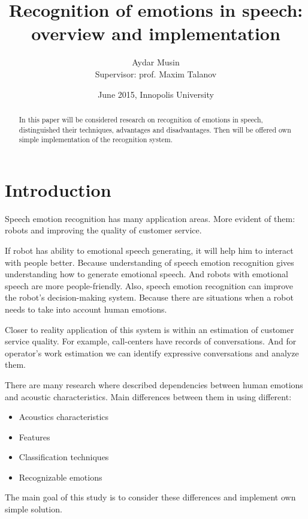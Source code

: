 \documentclass[12pt, letterpaper]{article}
\title{Recognition of emotions in speech:\\overview and implementation}
\author{Aydar Musin\\Supervisor: prof. Maxim Talanov}
\date{June 2015, Innopolis University}
\begin{document}
\begin{titlepage}
\maketitle
\end{titlepage}

\begin{abstract}
In this paper will be considered research on recognition of emotions in speech, distinguished their techniques, advantages and disadvantages. Then will be offered own simple implementation of the recognition system.
\end{abstract}

\section{Introduction}

Speech emotion recognition has many application areas. More evident of them: robots and improving the quality of customer service.

If robot has ability to emotional speech generating, it will help him to interact with people better. Because understanding of speech emotion recognition gives understanding how to generate emotional speech. And robots with emotional speech are more people-friendly. Also, speech emotion recognition can improve the robot's decision-making system. Because there are situations when a robot needs to take into account human emotions. %

Closer to reality application of this system is within an estimation of customer service quality. For example, call-centers have records of conversations. And for operator's work estimation we can identify expressive conversations and analyze them.

There are many research where described dependencies between human emotions and acoustic characteristics. Main differences between them in using different:
\begin{itemize}
	\item Acoustics characteristics
	\item Features
	\item Classification techniques
	\item Recognizable emotions
\end{itemize}

The main goal of this study is to consider these differences and implement own simple solution.
\\
\\
\\
\\
\end{document}
